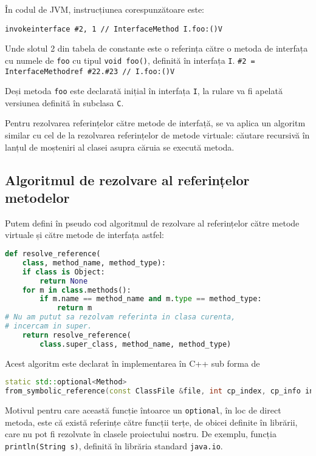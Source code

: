 În codul de JVM, instrucțiunea corespunzătoare este:

\texttt{invokeinterface \#2,  1            // InterfaceMethod I.foo:()V}

Unde slotul 2 din tabela de constante este o referința către o metoda de
interfața cu numele de \texttt{foo} cu tipul \texttt{void foo()}, definită în
interfața \texttt{I}.
\texttt{\#2 = InterfaceMethodref \#22.\#23        // I.foo:()V}

Deși metoda \texttt{foo} este declarată inițial în interfața \texttt{I}, la
rulare va fi apelată versiunea definită în subclasa \texttt{C}.

Pentru rezolvarea referințelor către metode de interfață, se va aplica un algoritm similar cu
cel de la rezolvarea referințelor de metode virtuale: căutare recursivă în
lanțul de moșteniri al clasei asupra căruia se execută metoda.

\subsection{Algoritmul de rezolvare al referințelor metodelor}

Putem defini în pseudo cod algoritmul de rezolvare al referințelor către metode
virtuale și către metode de interfața astfel:

\begin{lstlisting}[language=Python]
def resolve_reference(
    class, method_name, method_type):
    if class is Object:
        return None
    for m in class.methods():
        if m.name == method_name and m.type == method_type:
            return m
# Nu am putut sa rezolvam referinta in clasa curenta,
# incercam in super.
    return resolve_reference(
        class.super_class, method_name, method_type)
\end{lstlisting}

Acest algoritm este declarat în implementarea în C++ sub forma de

\begin{lstlisting}[language=C++]
static std::optional<Method>
from_symbolic_reference(const ClassFile &file, int cp_index, cp_info info);
\end{lstlisting}

Motivul pentru care această funcție întoarce un \texttt{optional}, în loc de
direct metoda, este că există referințe către funcții terțe, de
obicei definite în librării, care nu pot fi rezolvate în clasele proiectului nostru.
De exemplu, funcția \texttt{println(String s)}, definită în librăria standard
\texttt{java.io}.

